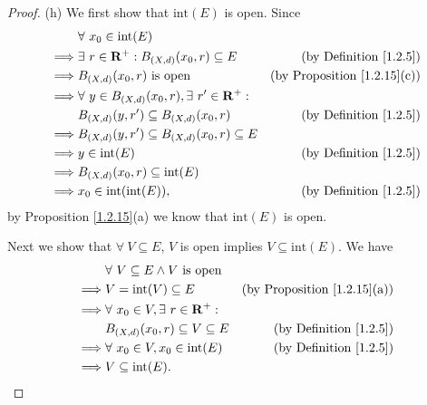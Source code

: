 \begin{proof}{(h)}
    We first show that \(\text{int}(E)\) is open.
    Since
    \begin{align*}
                 & \forall\ x_0 \in \text{int}(E)                                                                              \\
        \implies & \exists\ r \in \mathbf{R}^+ : B_{(X, d)}(x_0, r) \subseteq E      & \text{(by Definition \ref{1.2.5})}      \\
        \implies & B_{(X, d)}(x_0, r) \text{ is open}                                & \text{(by Proposition \ref{1.2.15}(c))} \\
        \implies & \forall\ y \in B_{(X, d)}(x_0, r), \exists\ r' \in \mathbf{R}^+ :                                           \\
                 & B_{(X, d)}(y, r') \subseteq B_{(X, d)}(x_0, r)                    & \text{(by Definition \ref{1.2.5})}      \\
        \implies & B_{(X, d)}(y, r') \subseteq B_{(X, d)}(x_0, r) \subseteq E                                                  \\
        \implies & y \in \text{int}(E)                                               & \text{(by Definition \ref{1.2.5})}      \\
        \implies & B_{(X, d)}(x_0, r) \subseteq \text{int}(E)                                                                  \\
        \implies & x_0 \in \text{int}(\text{int}(E)),                                & \text{(by Definition \ref{1.2.5})}
    \end{align*}
    by Proposition \ref{1.2.15}(a) we know that \(\text{int}(E)\) is open.

    Next we show that \(\forall\ V \subseteq E\), \(V\) is open implies \(V \subseteq \text{int}(E)\).
    We have
    \begin{align*}
                 & \forall\ V \subseteq E \land V \text{ is open}                                              \\
        \implies & V = \text{int}(V) \subseteq E                     & \text{(by Proposition \ref{1.2.15}(a))} \\
        \implies & \forall\ x_0 \in V, \exists\ r \in \mathbf{R}^+ :                                           \\
                 & B_{(X, d)}(x_0, r) \subseteq V \subseteq E        & \text{(by Definition \ref{1.2.5})}      \\
        \implies & \forall\ x_0 \in V, x_0 \in \text{int}(E)         & \text{(by Definition \ref{1.2.5})}      \\
        \implies & V \subseteq \text{int}(E).
    \end{align*}


\end{proof}
